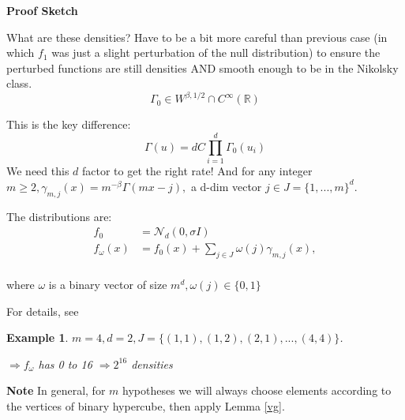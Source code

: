 \documentclass[10pt]{article}
\newtheorem{example}[ex]{Example}
\newcommand{\normal}{\mathcal{N}}
\newcommand{\sobolev}[2]{W^{#1,#2}}
\newcommand{\R}{\mathbb{R}}
\begin{document}
\textbf{Proof Sketch}

What are these densities?  Have to be a bit more careful than previous case (in which $f_1$ was just a slight perturbation of the null distribution) to ensure the perturbed functions are still densities AND smooth enough to be in the Nikolsky class.
\[\Gamma_0\in\sobolev{\beta}{1/2} \cap C^\infty(\R)\]

This is the key difference:
\[\Gamma(u) = dC\prod_{i=1}^d\Gamma_0(u_i) \]
We need this $d$ factor to get the right rate!
And for any integer $m\geq2, \gamma_{m,j}(x)=m^{-\beta}\Gamma(mx-j),$ a d-dim vector $j\in J=\{1,...,m\}^d$.

The distributions are:
\begin{align*}
f_0 &= \normal_d(0,\sigma I)\\
f_\omega(x) &= 
	f_0(x) 
	+ \sum_{j\in J} \omega(j) \gamma_{m,j}(x),\\
\end{align*}

where $\omega$ is a binary vector of size $m^d, \omega(j)\in\{0,1\}$

For details, see \cite{mcdonald}
\begin{example}
$m=4,d=2,J=\{(1,1),(1,2),(2,1),...,(4,4)\}$.

$\Rightarrow f_\omega$ has 0 to 16 $\Rightarrow 2^16$ densities

\end{example}


\textbf{Note}
In general, for $m$ hypotheses we will always choose elements according to the vertices of binary hypercube, then apply Lemma \ref{vg}.
\end{document}
